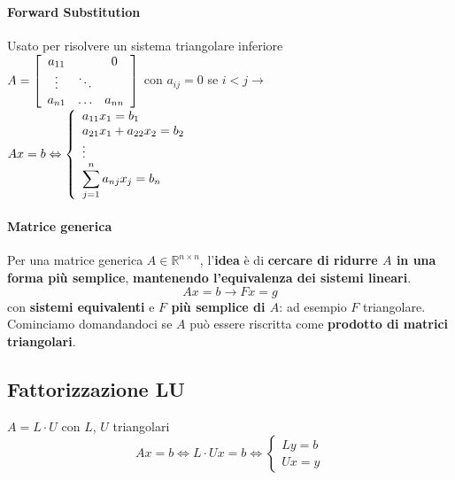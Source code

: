 \documentclass[10pt]{book}
\begin{document}
\paragraph{Forward Substitution}
Usato per risolvere un sistema triangolare inferiore\\
	\begin{math}
	A = \left[
	\begin{array}{c c c}
	a_{11} & & 0\\
	\vdots & \ddots\\
	a_{n1} & \ldots & a_{nn}
	\end{array}
	\right]
	\end{math}
	con $a_{ij} = 0$ se $i < j \rightarrow$
	\begin{math}
	Ax = b \Leftrightarrow \left\{
	\begin{array}{l}
		a_{11}x_1 = b_1\\
		a_{21}x_1 + a_{22}x_2 = b_2\\
		\vdots\\
		\mathlarger{\sum_{j = 1}^n a_{nj}x_j = b_n}\\
	\end{array}
	\right.
	\end{math}
\paragraph{Matrice generica} Per una matrice generica $A \in \mathbb{R}^{n \times n}$, l'\textbf{idea} è di \textbf{cercare di ridurre $A$ in una forma più semplice}, \textbf{mantenendo l'equivalenza dei sistemi lineari}.
$$Ax = b \longrightarrow Fx = g$$ con \textbf{sistemi equivalenti} e \textbf{$F$ più semplice di $A$}: ad esempio $F$ triangolare.\\
Cominciamo domandandoci se $A$ può essere riscritta come \textbf{prodotto di matrici triangolari}.
\subsection{Fattorizzazione LU}
$A = L\cdot U$ con $L$, $U$ triangolari
$$Ax = b \Leftrightarrow L\cdot Ux = b \Leftrightarrow \left\{ \begin{array}{l}
	Ly = b\\
	Ux = y
\end{array}
\right.$$
\end{document}
